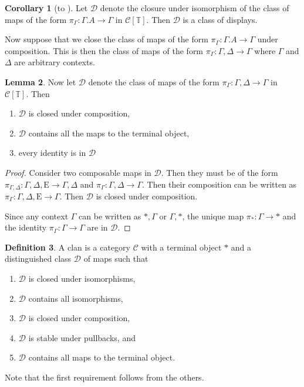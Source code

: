 \documentclass{article}
\theoremstyle{definition}
\newtheorem{definition}{Definition}[section]
\newtheorem{lemma}[definition]{Lemma}
\newtheorem{corollary}[definition]{Corollary}
\newcommand{\T}{\mathbb T}
\newcommand{\C}{\mathcal C}
\newcommand{\D}{\mathcal D}
\newcommand{\syncat}[1]{\C [#1]}
\newcommand{\Epsilon}{\mathrm E}
\begin{document}
\begin{corollary}[to ]
    Let $\D$ denote the closure under isomorphism of the class of maps of the form $\pi_\Gamma : \Gamma.A \to \Gamma$ in $\syncat{\T}$. Then $\D$ is a class of displays.
\end{corollary}

Now suppose that we close the class of maps of the form $\pi_\Gamma : \Gamma.A \to \Gamma$ under composition. This is then the class of maps of the form $\pi_\Gamma : \Gamma, \Delta \to \Gamma$ where $\Gamma$ and $\Delta$ are arbitrary contexts.

\begin{lemma}\label{lem:syn-clan}
    Now let $\D$ denote the class of maps of the form $\pi_\Gamma : \Gamma, \Delta \to \Gamma$ in $\syncat{\T}$. Then
    \begin{enumerate}
        \item $\D$ is closed under composition,
        \item $\D$ contains all the maps to the terminal object,
        \item every identity is in $\D$
    \end{enumerate} 
\end{lemma}
\begin{proof}
    Consider two composable maps in $\D$. Then they must be of the form $\pi_{\Gamma, \Delta}: \Gamma, \Delta, \Epsilon \to \Gamma, \Delta$ and $\pi_\Gamma : \Gamma, \Delta \to \Gamma$. Then their composition can be written as $\pi_\Gamma : \Gamma, \Delta, \Epsilon \to \Gamma$. Then $\D$ is closed under composition.

    Since any context $\Gamma$ can be written as $*, \Gamma$ or $\Gamma, *$, the unique map $\pi_* : \Gamma \to *$ and the identity $\pi_\Gamma : \Gamma \to \Gamma$
    are in $\D$.
\end{proof}

\begin{definition}
    A clan \cite{joyal} is a category $\C$ with a terminal object $*$ and a distinguished class $\D$ of maps such that
    \begin{enumerate}
        \item $\D$ is closed under isomorphisms,
        \item $\D$ contains all isomorphisms,
        \item $\D$ is closed under composition,
        \item $\D$ is stable under pullbacks, and
        \item $\D$ contains all maps to the terminal object.
    \end{enumerate}
    Note that the first requirement follows from the others.
\end{definition}
\end{document}
